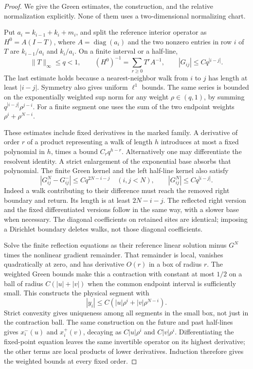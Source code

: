 \begin{proof}
We give the Green estimates, the construction, and the relative
normalization explicitly.  None of them uses a two-dimensional
normalizing chart.

Put $a_i=k_{i-1}+k_i+m_i$, and split the reference interior operator as
$H^0=A(I-T)$, where $A=\operatorname{diag}(a_i)$ and the two nonzero
entries in row $i$ of $T$ are $k_{i-1}/a_i$ and $k_i/a_i$.
On a finite interval or a half-line,
\[
 \|T\|_\infty\le q<1,\qquad
 (H^0)^{-1}=\sum_{r\ge0}T^r A^{-1},\qquad
 |G_{ij}|\le Cq^{|i-j|}.
\]
The last estimate holds because a nearest-neighbor walk from $i$ to $j$
has length at least $|i-j|$.  Symmetry also gives uniform $\ell^1$ bounds.
The same series is bounded on the exponentially weighted sup norm for
any weight $\rho\in(q,1)$, by summing
$q^{|i-j|}\rho^{j-i}$.  For a finite segment one uses the sum of the two
endpoint weights $\rho^i+\rho^{N-i}$.

These estimates include fixed derivatives in the marked family.
A derivative of order $r$ of a product representing a walk of length
$h$ introduces at most a fixed polynomial in $h$, times a bound
$C_rq^{h-r}$.  Alternatively one may differentiate the resolvent identity.
A strict enlargement of the exponential base absorbs that polynomial.
The finite Green kernel and the left half-line kernel also satisfy
\begin{equation}\label{eq:v64-green-reflection}
 |G^N_{ij}-G^-_{ij}|\le Cq^{2N-i-j}\quad (i,j<N),
 \qquad |G^N_{ij}|\le Cq^{|i-j|}.
\end{equation}
Indeed a walk contributing to their difference must reach the removed
right boundary and return.  Its length is at least $2N-i-j$.
The reflected right version and the fixed differentiated versions follow
in the same way, with a slower base when necessary.  The diagonal
coefficients on retained sites are identical; imposing a Dirichlet
boundary deletes walks, not those diagonal coefficients.

Solve the finite reflection equations as their reference linear
solution minus $G^N$ times the nonlinear gradient remainder.  That
remainder is local, vanishes quadratically at zero, and has derivative
$O(r)$ in a box of radius $r$.  The weighted Green bounds make this a
contraction with constant at most $1/2$ on a ball of radius
$C(|u|+|v|)$ when the common endpoint interval is sufficiently small.
This constructs the physical segment with
\[
 |y_i|\le C(|u|\rho^i+|v|\rho^{N-i}).
\]
Strict convexity gives uniqueness among all segments in the small box,
not just in the contraction ball.  The same construction on the future
and past half-lines gives $x_i^-(u)$ and $x_i^+(v)$, decaying as
$C|u|\rho^i$ and $C|v|\rho^i$.  Differentiating the fixed-point
equation leaves the same invertible operator on its highest derivative;
the other terms are local products of lower derivatives.  Induction
therefore gives the weighted bounds at every fixed order.


\end{proof}
